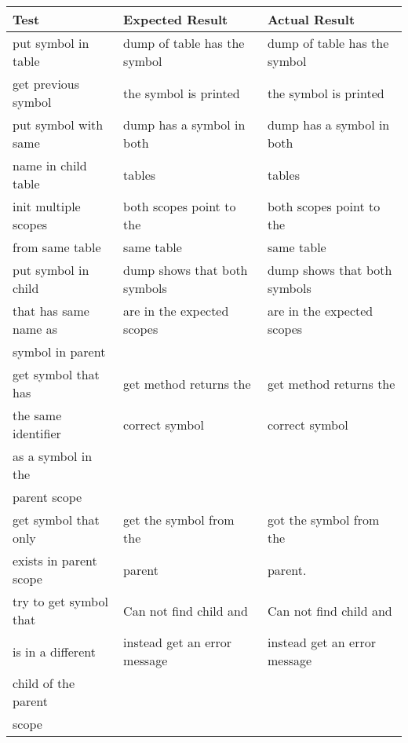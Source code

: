 \documentclass{article}
\begin{document}
\begin{tabular}{| l | l | l |}
    \hline
    \textbf{Test} & \textbf{Expected Result} & \textbf{Actual Result} \\ 
    \hline
    put symbol in table    & dump of table has the symbol & dump of table has the symbol \\ \hline
    get previous symbol    & the symbol is printed        & the symbol is printed \\ 
    \hline 
    put symbol with same   & dump has a symbol in both    & dump has a symbol in both\\  
    name in child table    & tables                       & tables \\ 
    \hline
    init multiple scopes   & both scopes point to the     & both scopes point to the \\
    from same table        & same table                   & same table \\ 
    \hline
    put symbol in child    & dump shows that both symbols & dump shows that both symbols \\  
    that has same name as  & are in the expected scopes   & are in the expected scopes \\
    symbol in parent       &                              & \\
    \hline
    get symbol that has    & get method returns the       & get method returns the \\
    the same identifier    & correct symbol               & correct symbol \\
    as a symbol in the     & & \\
    parent scope           & & \\
    \hline
    get symbol that only   & get the symbol from the      & got the symbol from the \\  
    exists in parent scope & parent                       & parent. \\
    \hline
    try to get symbol that & Can not find child and       & Can not find child and \\
    is in a different      & instead get an error message & instead get an error message \\
    child of the parent    &                              & \\
    scope                  &                              & \\
    \hline
\end{tabular}
\end{document}
